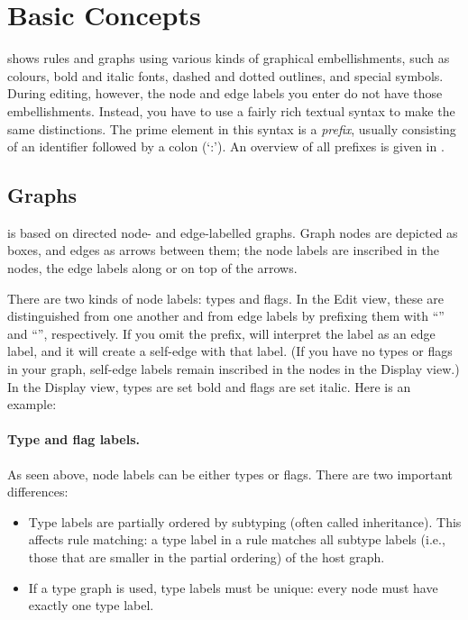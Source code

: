 \clearpage
\section{Basic Concepts}

\GROOVE shows rules and graphs using various kinds of graphical embellishments,
such as colours, bold and italic fonts, dashed and dotted outlines, and special
symbols. During editing, however, the node and edge labels you enter do not
have those embellishments. Instead, you have to use a fairly rich textual
syntax to make the same distinctions. The prime element in this syntax is a
\emph{prefix}, usually consisting of an identifier followed by a colon (`:'). An overview of all prefixes is given in .

\FloatBarrier


\subsection{Graphs}

\GROOVE is based on directed node- and edge-labelled graphs. Graph nodes are
depicted as boxes, and edges as arrows between them; the node labels are
inscribed in the nodes, the edge labels along or on top of the arrows.

There are two kinds of node labels: types and flags. In the Edit view, these
are distinguished from one another and from edge labels by prefixing them with
``\typeP'' and ``\flagP'', respectively. If you omit the prefix, \GROOVE will
interpret the label as an edge label, and it will create a self-edge with that
label. (If you have no types or flags in your graph, self-edge labels remain
inscribed in the nodes in the Display view.) In the Display view, types are set
bold and flags are set italic. Here is an example:


\paragraph{Type and flag labels.}

As seen above, node labels can be either types or flags. There are two
important differences:
\begin{itemize}\noitemsep
\item Type labels are partially ordered by subtyping (often called
  inheritance). This affects rule matching: a type label in a rule matches all
  subtype labels (i.e., those that are smaller in the partial ordering) of the
  host graph.
\item If a type graph is used, type labels must be unique: every node must have
  exactly one type label.
\end{itemize}

